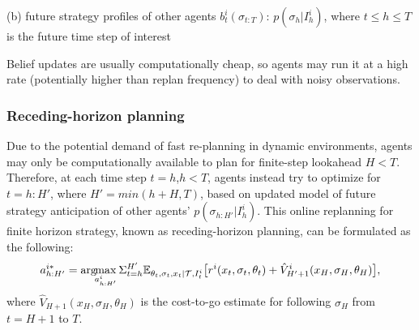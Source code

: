 \documentclass[letterpaper, 10 pt, conference]{ieeeconf}  %
\newcommand{\argmax}{\arg\!\!\max}
\begin{document}
(b) future strategy profiles of other agents $b^i_t(\sigma_{t:T})$: 
    $p(\sigma_h|I^i_h)$, where $t\leq h\leq T$ is the future time step of interest

Belief updates are usually computationally cheap, so agents may run it at a high 
rate (potentially higher than replan frequency) to deal with noisy 
observations. 
\subsubsection{Receding-horizon planning}\label{sec:receding}
Due to the potential demand of fast re-planning in dynamic environments, 
agents may only be computationally available to plan for finite-step lookahead $H<T$.
Therefore, at each time step $t=h$,$h<T$, agents instead try to optimize
for $t=h:H'$, where $H'=min(h+H,T)$, based on updated model of future strategy 
anticipation of other agents' $p(\sigma_{h:H'}|I^i_h)$. This online replanning 
for finite horizon strategy, known as receding-horizon planning, can be formulated as the following:
\begin{equation}
  a^{i*}_{h:H'} = \argmax_{a^i_{h:H'}} 
  \Sigma_{t=h}^{H'} 
  \mathbb{E}_{\theta_t,\sigma_{t},x_t|\mathcal{T},I^i_t} \big{[}
  r^i(x_t,\sigma_t,\theta_t)+ \hat{V}^i_{H'+1}(x_H,\sigma_H,\theta_H)\big{]}, 
\end{equation}
where $\hat{V}_{H+1}(x_H,\sigma_H,\theta_H)$ is the cost-to-go estimate for 
following $\sigma_H$ from $t=H+1$ to $T$.
\end{document}
